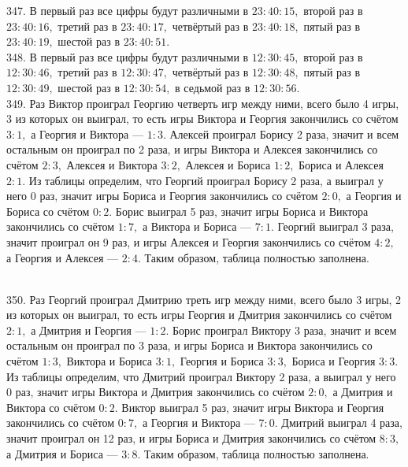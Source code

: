 347. В первый раз все цифры будут различными в $23:40:15,$ второй раз в $23:40:16,$ третий раз в $23:40:17,$ четвёртый раз в $23:40:18,$ пятый раз в $23:40:19,$ шестой раз в $23:40:51.$\\
348. В первый раз все цифры будут различными в $12:30:45,$ второй раз в $12:30:46,$ третий раз в $12:30:47,$ четвёртый раз в $12:30:48,$ пятый раз в $12:30:49,$ шестой раз в $12:30:54,$ в седьмой раз в $12:30:56.$\\
349. Раз Виктор проиграл Георгию четверть игр между ними, всего было 4 игры, 3 из которых он выиграл, то есть игры Виктора и Георгия закончились со счётом $3:1,$ а Георгия и Виктора --- $1:3.$ Алексей проиграл Борису 2 раза, значит и всем остальным он проиграл по 2 раза, и игры Виктора и Алексея закончились со счётом $2:3,$ Алексея и Виктора $3:2,$ Алексея и Бориса $1:2,$ Бориса и Алексея $2:1.$ Из таблицы определим, что Георгий проиграл Борису 2 раза, а выиграл у него 0 раз, значит игры Бориса и Георгия закончились со счётом $2:0,$ а Георгия и Бориса со счётом $0:2.$ Борис выиграл 5 раз, значит игры Бориса и Виктора закончились со счётом $1:7,$ а Виктора и Бориса --- $7:1.$ Георгий выиграл 3 раза, значит проиграл он 9 раз, и игры Алексея и Георгия закончились со счётом $4:2,$ а Георгия и Алексея --- $2:4.$ Таким образом, таблица полностью заполнена.
\begin{figure}[ht!]
\end{figure}\\
350. Раз Георгий проиграл Дмитрию треть игр между ними, всего было 3 игры, 2 из которых он выиграл, то есть игры Георгия и Дмитрия закончились со счётом $2:1,$ а Дмитрия и Георгия --- $1:2.$ Борис проиграл Виктору 3 раза, значит и всем остальным он проиграл по 3 раза, и игры Бориса и Виктора закончились со счётом $1:3,$ Виктора и Бориса $3:1,$ Георгия и Бориса $3:3,$ Бориса и Георгия $3:3.$ Из таблицы определим, что Дмитрий проиграл Виктору 2 раза, а выиграл у него 0 раз, значит игры Виктора и Дмитрия закончились со счётом $2:0,$ а Дмитрия и Виктора со счётом $0:2.$ Виктор выиграл 5 раз, значит игры Виктора и Георгия закончились со счётом $0:7,$ а Георгия и Виктора --- $7:0.$ Дмитрий выиграл 4 раза, значит проиграл он 12 раз, и игры Бориса и Дмитрия закончились со счётом $8:3,$ а Дмитрия и Бориса --- $3:8.$ Таким образом, таблица полностью заполнена.\\
\begin{figure}[ht!]
\end{figure}\\
